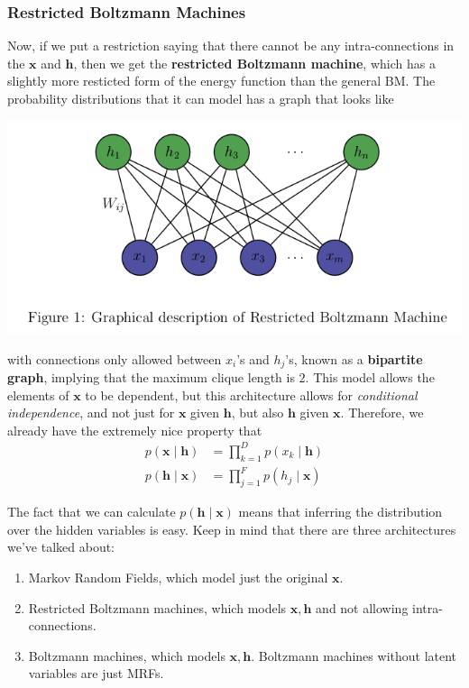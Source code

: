  \subsubsection{Restricted Boltzmann Machines} 

    \begin{definition} 
      Now, if we put a restriction saying that there cannot be any intra-connections in the $\mathbf{x}$ and $\mathbf{h}$, then we get the \textbf{restricted Boltzmann machine}, which has a slightly more resticted form of the energy function than the general BM. The probability distributions that it can model has a graph that looks like 
      \begin{center}
        \includegraphics[scale=0.4]{img/07_Boltzmann/rbm_layer.png}
      \end{center}
      with connections only allowed between $x_i$'s and $h_j$'s, known as a \textbf{bipartite graph}, implying that the maximum clique length is $2$. This model allows the elements of $\mathbf{x}$ to be dependent, but this architecture allows for \textit{conditional independence}, and not just for $\mathbf{x}$ given $\mathbf{h}$, but also $\mathbf{h}$ given $\mathbf{x}$. Therefore, we already have the extremely nice property that 
      \begin{align*} 
        p(\mathbf{x} \mid \mathbf{h}) & = \prod_{k=1}^{D} p(x_k \mid \mathbf{h}) \\
        p(\mathbf{h} \mid \mathbf{x}) & = \prod_{j=1}^F p(h_j \mid \mathbf{x}) 
      \end{align*}
    \end{definition}

    The fact that we can calculate $p(\mathbf{h} \mid \mathbf{x})$ means that inferring the distribution over the hidden variables is easy. Keep in mind that there are three architectures we've talked about: 
    \begin{enumerate}
      \item Markov Random Fields, which model just the original $\mathbf{x}$. 
      \item Restricted Boltzmann machines, which models $\mathbf{x}, \mathbf{h}$ and not allowing intra-connections. 
      \item Boltzmann machines, which models $\mathbf{x}, \mathbf{h}$. Boltzmann machines without latent variables are just MRFs.  
    \end{enumerate}

